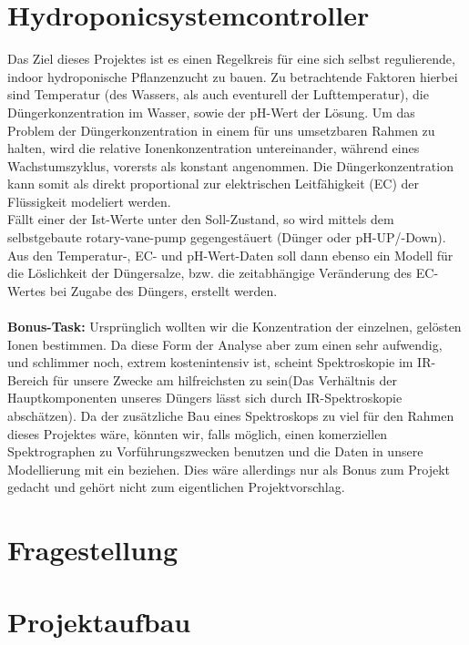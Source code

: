 \section{Hydroponicsystemcontroller}

Das Ziel dieses Projektes ist es einen Regelkreis für eine sich selbst regulierende, indoor hydroponische Pflanzenzucht zu bauen. Zu betrachtende Faktoren hierbei sind Temperatur (des Wassers, als auch eventurell der Lufttemperatur), die Düngerkonzentration im Wasser, sowie der pH-Wert der Lösung. Um das Problem der Düngerkonzentration in einem für uns umsetzbaren Rahmen zu halten, wird die relative Ionenkonzentration untereinander, während eines Wachstumszyklus, vorersts als konstant angenommen. Die Düngerkonzentration kann somit als direkt proportional zur elektrischen Leitfähigkeit (EC) der Flüssigkeit modeliert werden.\\
Fällt einer der Ist-Werte unter den Soll-Zustand, so wird mittels dem selbstgebaute rotary-vane-pump gegengestäuert (Dünger oder pH-UP/-Down).\\
Aus den Temperatur-, EC- und pH-Wert-Daten soll dann ebenso ein Modell für die Löslichkeit der Düngersalze, bzw. die zeitabhängige Veränderung des EC-Wertes bei Zugabe des Düngers, erstellt werden.\\
\\
\textbf{Bonus-Task:}
Ursprünglich wollten wir die Konzentration der einzelnen, gelösten Ionen bestimmen. Da diese Form der Analyse aber zum einen sehr aufwendig, und schlimmer noch, extrem kostenintensiv ist, scheint Spektroskopie im IR-Bereich für unsere Zwecke am hilfreichsten zu sein(Das Verhältnis der Hauptkomponenten unseres Düngers lässt sich durch IR-Spektroskopie abschätzen). Da der zusätzliche Bau eines Spektroskops zu viel für den Rahmen dieses Projektes wäre, könnten wir, falls möglich, einen komerziellen Spektrographen zu Vorführungszwecken benutzen und die Daten in unsere Modellierung mit ein beziehen. Dies wäre allerdings nur als Bonus zum Projekt gedacht und gehört nicht zum eigentlichen Projektvorschlag.

\section*{Fragestellung}

\section*{Projektaufbau}

